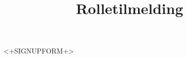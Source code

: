 \documentclass[a4paper,11pt,oneside]{article}
\title{Rolletilmelding}
\begin{document}
\setlength\LTleft{0pt}
\setlength\LTright{0pt}

<+SIGNUPFORM+>
\end{document}
